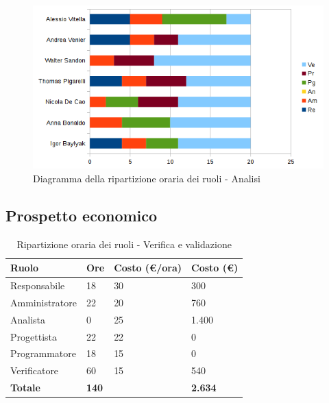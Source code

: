 \documentclass[12pt,a4paper]{article}
\begin{document}
\begin{center}
\begin{figure}[h]
\centering
\includegraphics[width=\textwidth]{diagrammaBarreVerificaValidazioneRotazioneRuoli.png}
\caption{Diagramma della ripartizione oraria dei ruoli - Analisi}
\end{figure}
\end{center}

\subsection{Prospetto economico}

\begin{table}[H]
\begin{center}
\begin{tabular}{p{} p{} p{} p{} }
\toprule
\textbf{Ruolo}	& \textbf{Ore} & \textbf{Costo (\euro/ora)}	& \textbf{Costo (\euro)} \\
\midrule
\midrule
Responsabile & 18 & 30 & 300\\
\midrule
Amministratore & 22 & 20 & 760\\ 
\midrule
Analista & 0 & 25 & 1.400\\ 
\midrule
Progettista & 22 & 22 & 0\\ 
\midrule
Programmatore & 18 & 15 & 0\\ 
\midrule
Verificatore & 60 & 15 & 540\\ 
\midrule
\textbf{Totale} & \textbf{140} &  & \textbf{2.634}\\
\bottomrule
\end{tabular}
\caption{Ripartizione oraria dei ruoli - Verifica e validazione}
\end{center}
\end{table}
\end{document}
